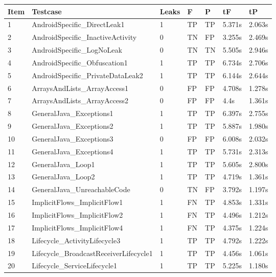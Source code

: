 \begin{table}[H]
\begin{center}
\small\addtolength{\tabcolsep}{-3pt}
\begin{tabular}{|p{1cm}|p{6cm}|p{1cm}|p{1cm}|p{1cm}|p{1cm}|p{1cm}|}
	\hline
	\textbf{Item} & \textbf{Testcase} & \textbf{Leaks} & \textbf{F} &
	\textbf{P} & \textbf{ tF} & 
	\textbf{tP}\\
	\hline
	1 & AndroidSpecific\_DirectLeak1 & 1 & TP & TP &5.371s &2.063s\\
	\hline
	2 & AndroidSpecific\_InactiveActivity & 0 & TN & FP  &3.255s &2.469s\\
	\hline
	3 & AndroidSpecific\_LogNoLeak & 0 & TN & TN &5.505s &2.946s\\
	\hline
	4 & AndroidSpecific\_Obfuscation1 & 1 & TP & TP &6.734s &2.706s\\
	\hline
	5 & AndroidSpecific\_PrivateDataLeak2 & 1 & TP & TP & 6.144s &2.644s\\
	\hline
	6 & ArraysAndLists\_ArrayAccess1 & 0 & FP & FP & 4.708s & 1.278s\\
	\hline
	7 & ArraysAndLists\_ArrayAccess2 & 0 & FP & FP & 4.4s &1.361s\\
	 \hline
	8 & GeneralJava\_Exceptions1 & 1 & TP & TP &6.397s &2.755s\\
	\hline
	9 &  GeneralJava\_Exceptions2 & 1 & TP & TP &5.887s &1.980s\\
	\hline
	10 & GeneralJava\_Exceptions3 & 0 & FP & FP &6.008s &2.032s\\
	\hline
	11 & GeneralJava\_Exceptions4 & 1 & TP & TP &5.731s &2.313s\\
	\hline
	12 & GeneralJava\_Loop1 & 1 & TP & TP &5.605s &2.800s\\
	\hline
	13 & GeneralJava\_Loop2 & 1 & TP & TP &4.719s &1.361s\\
	\hline
	14 & GeneralJava\_UnreachableCode & 0 & TN & FP &3.792s &1.197s\\
	\hline
	15 & ImplicitFlows\_ImplicitFlow1 & 1 & FN & TP &4.853s &1.331s\\
	\hline
	16 & ImplicitFlows\_ImplicitFlow2 & 1 & FN & TP &4.496s &1.212s\\
	\hline
	17 & ImplicitFlows\_ImplicitFlow4 & 1 & FN & TP &4.375s &1.224s\\
	\hline
	18 & Lifecycle\_ActivityLifecycle3 & 1 & TP & TP &4.792s &1.222s\\
	\hline
	19 & Lifecycle\_BroadcastReceiverLifecycle1 & 1 & TP & TP &4.456s &1.061s\\
	\hline
	20 & Lifecycle\_ServiceLifecycle1 & 1 & TP & TP &5.225s &1.180s\\

\end{tabular}
\end{center}
\end{table}
